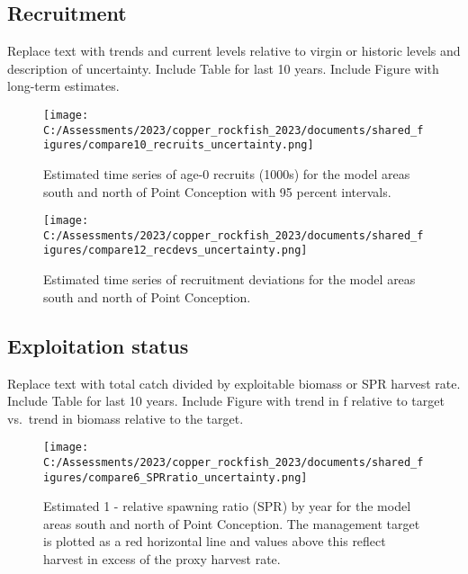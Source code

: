 \documentclass[11pt,
  english,
  letterpaper,
]{article}
\begin{document}
\clearpage

\hypertarget{recruitment}{%
\subsection*{Recruitment}\label{recruitment}}

Replace text with trends and current levels relative to virgin or historic levels and description of uncertainty. Include Table for last 10 years. Include Figure with long-term estimates.





\begin{figure}
\centering
\texttt{[image: C:/Assessments/2023/copper\_rockfish\_2023/documents/shared\_figures/compare10\_recruits\_uncertainty.png]}
\caption{Estimated time series of age-0 recruits (1000s) for the model areas south and north of Point Conception with 95 percent intervals.\label{fig:es-recruits}}
\end{figure}

\begin{figure}
\centering
\texttt{[image: C:/Assessments/2023/copper\_rockfish\_2023/documents/shared\_figures/compare12\_recdevs\_uncertainty.png]}
\caption{Estimated time series of recruitment deviations for the model areas south and north of Point Conception.\label{fig:es-rec-devs}}
\end{figure}

\clearpage

\hypertarget{exploitation-status}{%
\subsection*{Exploitation status}\label{exploitation-status}}

Replace text with total catch divided by exploitable biomass or SPR harvest rate. Include Table for last 10 years. Include Figure with trend in f relative to target vs.~trend in biomass relative to the target.





\begin{figure}
\centering
\texttt{[image: C:/Assessments/2023/copper\_rockfish\_2023/documents/shared\_figures/compare6\_SPRratio\_uncertainty.png]}
\caption{Estimated 1 - relative spawning ratio (SPR) by year for the model areas south and north of Point Conception. The management target is plotted as a red horizontal line and values above this reflect harvest in excess of the proxy harvest rate.\label{fig:es-1-spr}}
\end{figure}
\end{document}
